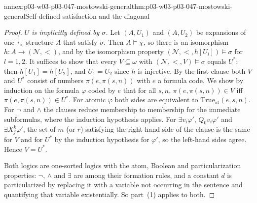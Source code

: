 \begin{annexitem}{annex:p03-w03-p03-047-mostowski-general}{thm:p03-w03-p03-047-mostowski-general}{Self-defined satisfaction and the diagonal}
\begin{proof}
\emph{\(U\) is implicitly defined by \(\sigma\).}  Let \((A,U_1)\) and
\((A,U_2)\) be expansions of one \(\tau_<\)-structure \(A\) that satisfy
\(\sigma\).  Then \(A\models\chi\), so there is an isomorphism
\(h:A\to(\mathcal N,<)\), and by the isomorphism property
\((\mathcal N,<,h[U_l])\models\sigma\) for \(l=1,2\).  It suffices to show
that every \(V\subseteq\omega\) with \((\mathcal N,<,V)\models\sigma\)
equals \(U^\ast\); then \(h[U_1]=h[U_2]\), and \(U_1=U_2\) since \(h\) is
injective.  By the first clause both \(V\) and \(U^\ast\) consist of
numbers \(\pi(e,\pi(s,n))\) with \(e\) a formula code.  We show by
induction on the formula \(\varphi\) coded by \(e\) that for all \(s,n\),
\(\pi(e,\pi(s,n))\in V\) iff \(\pi(e,\pi(s,n))\in U^\ast\).  For atomic
\(\varphi\) both sides are equivalent to \(\mathrm{True}_{\mathrm{at}}(e,s,n)\).
For \(\neg\) and \(\land\) the clauses reduce membership to membership for
the immediate subformulas, where the induction hypothesis applies.  For
\(\exists v_i\varphi'\), \(Q_0v_i\varphi'\) and \(\exists X^k_j\varphi'\),
the set of \(m\) (or \(r\)) satisfying the right-hand side of the clause is
the same for \(V\) and for \(U^\ast\) by the induction hypothesis for
\(\varphi'\), so the left-hand sides agree.  Hence \(V=U^\ast\).

Both logics are one-sorted logics with the atom, Boolean and
particularization properties: \(\neg\), \(\land\) and \(\exists\) are among
their formation rules, and a constant \(d\) is particularized by replacing
it with a variable not occurring in the sentence and quantifying that
variable existentially.  So part~(1) applies to both.
\end{proof}
\end{annexitem}

